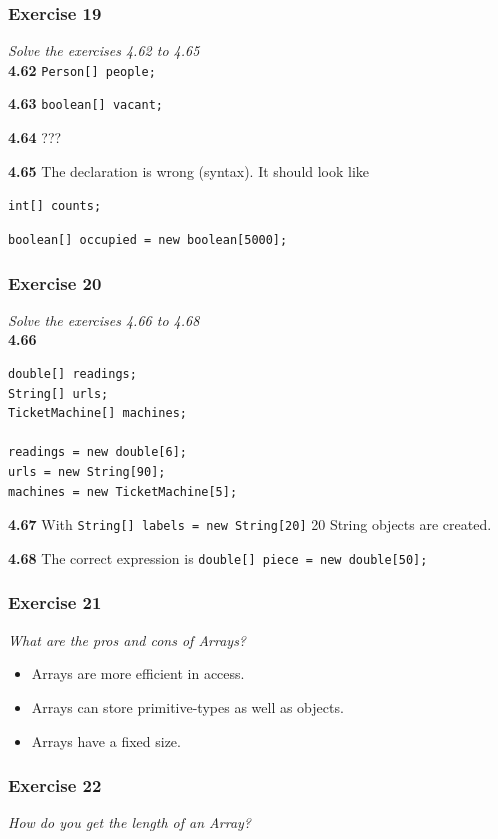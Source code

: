 \subsubsection*{Exercise 19}
\textit{Solve the exercises 4.62 to 4.65}\\

\textbf{4.62} \lstinline{Person[] people;}

\textbf{4.63} \lstinline{boolean[] vacant;}

\textbf{4.64} ???

\textbf{4.65} The declaration is wrong (syntax). It should look like

\lstinline{int[] counts;}

\lstinline{boolean[] occupied = new boolean[5000];}

\subsubsection*{Exercise 20}
\textit{Solve the exercises 4.66 to 4.68}\\

\textbf{4.66}
\begin{lstlisting}
double[] readings;
String[] urls;
TicketMachine[] machines;

readings = new double[6];
urls = new String[90];
machines = new TicketMachine[5];
\end{lstlisting}

\textbf{4.67} With \lstinline{String[] labels = new String[20]} 20 String 
objects are created.

\textbf{4.68} The correct expression is 
\lstinline{double[] piece = new double[50];}

\subsubsection*{Exercise 21}
\textit{What are the pros and cons of Arrays?}\\

\begin{itemize}
	\item[\ding{51}] Arrays are more efficient in access.
	\item[\ding{51}] Arrays can store primitive-types as well as objects.
	\item[\ding{55}] Arrays have a fixed size. 
\end{itemize}

\subsubsection*{Exercise 22}
\textit{How do you get the length of an Array?}\\

